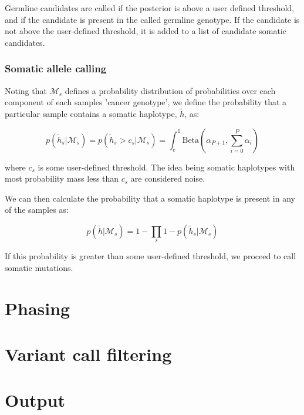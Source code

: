 \documentclass{article}
\begin{document}
Germline candidates are called if the posterior is above a user defined threshold, and if the candidate is present in the called germline genotype. If the candidate is not above the user-defined threshold, it is added to a list of candidate somatic candidates.

\subsubsection{Somatic allele calling}

Noting that $\mathcal{M}_s$ defines a probability distribution of probabilities over each component of each samples 'cancer genotype', we define the probability that a particular sample contains a somatic haplotype, $\tilde{h}$, as:

\begin{equation}
\label{eq:somatic_probability_sample}
p(\tilde{h}_s | \mathcal{M}_s) = p(\tilde{h}_s > c_s | \mathcal{M}_s) = \int_c^1 \text{Beta}(\alpha_{P + 1}, \sum_{i = 0}^{P} \alpha_i)
\end{equation}

\noindent where $c_s$ is some user-defined threshold. The idea being somatic haplotypes with most probability mass less than $c_s$ are considered noise.

We can then calculate the probability that a somatic haplotype is present in any of the samples as:

\begin{equation}
\label{eq:somatic_probability}
p(\tilde{h} | \mathcal{M}_s) = 1 - \prod_s 1 - p(\tilde{h}_s | \mathcal{M}_s)
\end{equation}

\noindent If this probability is greater than some user-defined threshold, we proceed to call somatic mutations.



\section{Phasing}

\section{Variant call filtering}

\section{Output}
\end{document}
